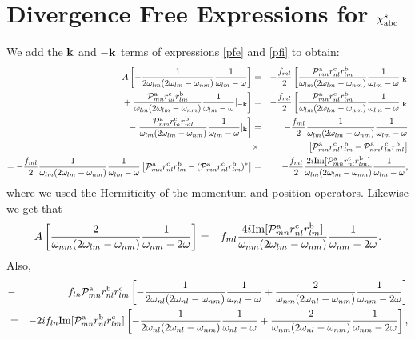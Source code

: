 \section{Divergence Free Expressions for $\chi^s_{\mathrm{a}\mathrm{b}\mathrm{c}}$}
We add the $\mathbf{k}$ and $-\mathbf{k}$ terms of expressions \eqref{pfe} and
\eqref{pfi} to obtain:
\begin{eqnarray}\label{chi1}
A
\left[
-\frac{1}{2\omega_{lm}(2\omega_{lm}-\omega_{nm})}\frac{1}{\omega_{lm}-\omega}
\right]&=&-\frac{f_{ml}}{2}
\left[
\frac{{\cal P}^{\mathrm{a}}_{mn}r^{\mathrm{c}}_{nl}r^{\mathrm{b}}_{lm}}{\omega_{lm}(2\omega_{lm}-\omega_{nm})}\frac{1}{\omega_{lm}-\omega}|_{\mathbf{k}}
\right.
\nonumber\\
+
\left.
\frac{{\cal P}^{\mathrm{a}}_{mn}r^{\mathrm{c}}_{nl}r^{\mathrm{b}}_{lm}}{\omega_{lm}(2\omega_{lm}-\omega_{nm})}\frac{1}{\omega_{lm}-\omega}|_{-\mathbf{k}}
\right]
&=&-\frac{f_{ml}}{2}
\left[
\frac{{\cal P}^{\mathrm{a}}_{mn}r^{\mathrm{c}}_{nl}r^{\mathrm{b}}_{lm}}{\omega_{lm}(2\omega_{lm}-\omega_{nm})}\frac{1}{\omega_{lm}-\omega}|_{\mathbf{k}}
\right.
\nonumber\\
-
\left.
\frac{{\cal P}^{\mathrm{a}}_{nm}r^{\mathrm{c}}_{ln}r^{\mathrm{b}}_{ml}}{\omega_{lm}(2\omega_{lm}-\omega_{nm})}\frac{1}{\omega_{lm}-\omega}|_{\mathbf{k}}
\right]
&=&-\frac{f_{ml}}{2}
\frac{1}{\omega_{lm}(2\omega_{lm}-\omega_{nm})}\frac{1}{\omega_{lm}-\omega}
\nonumber\\
&\times&
\left[
{\cal P}^{\mathrm{a}}_{mn}r^{\mathrm{c}}_{nl}r^{\mathrm{b}}_{lm}
-
{\cal P}^{\mathrm{a}}_{nm}r^{\mathrm{c}}_{ln}r^{\mathrm{b}}_{ml}
\right]
\\
=-\frac{f_{ml}}{2}
\frac{1}{\omega_{lm}(2\omega_{lm}-\omega_{nm})}\frac{1}{\omega_{lm}-\omega}
\left[
{\cal P}^{\mathrm{a}}_{mn}r^{\mathrm{c}}_{nl}r^{\mathrm{b}}_{lm}
-
({\cal P}^{\mathrm{a}}_{mn}r^{\mathrm{c}}_{nl}r^{\mathrm{b}}_{lm})^*
\right]
&=&-\frac{f_{ml}}{2}
\frac{2i\mathrm{Im}[{\cal P}^{\mathrm{a}}_{mn}r^{\mathrm{c}}_{nl}r^{\mathrm{b}}_{lm}]}{\omega_{lm}(2\omega_{lm}-\omega_{nm})}\frac{1}{\omega_{lm}-\omega}
\nonumber
,
\end{eqnarray}
where we used the Hermiticity of the momentum and position operators.
Likewise we get that
\begin{eqnarray}\label{si}
A
\left[
\frac{2}{\omega_{nm}(2\omega_{lm}-\omega_{nm})}\frac{1}{\omega_{nm}-2\omega}
\right]&=&
f_{ml}
\frac{4i\mathrm{Im}[{\cal P}^{\mathrm{a}}_{mn}r^{\mathrm{c}}_{nl}r^{\mathrm{b}}_{lm}]}{\omega_{nm}(2\omega_{lm}-\omega_{nm})}\frac{1}{\omega_{nm}-2\omega}
.
\end{eqnarray}
Also,
\begin{eqnarray}\label{is}
&-&
f_{ln}{\cal P}^{\mathrm{a}}_{mn}r^{\mathrm{b}}_{nl}r^{\mathrm{c}}_{lm}
\left[
-\frac{1}{2\omega_{nl}(2\omega_{nl}-\omega_{nm})}\frac{1}{\omega_{nl}-\omega}
+\frac{2}{\omega_{nm}(2\omega_{nl}-\omega_{nm})}\frac{1}{\omega_{nm}-2\omega}
\right]
\nonumber\\
&=&
-
2if_{ln}\mathrm{Im}[{\cal P}^{\mathrm{a}}_{mn}r^{\mathrm{b}}_{nl}r^{\mathrm{c}}_{lm}]
\left[
-\frac{1}{2\omega_{nl}(2\omega_{nl}-\omega_{nm})}\frac{1}{\omega_{nl}-\omega}
+\frac{2}{\omega_{nm}(2\omega_{nl}-\omega_{nm})}\frac{1}{\omega_{nm}-2\omega}
\right]
,
\end{eqnarray}
